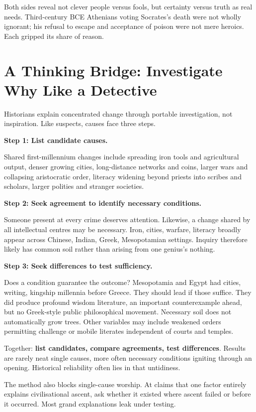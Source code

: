 Both sides reveal not clever people versus fools, but certainty versus truth as real needs. Third-century BCE Athenians voting Socrates's death were not wholly ignorant; his refusal to escape and acceptance of poison were not mere heroics. Each gripped its share of reason.

\section[Thinking Bridge: Investigate Causes]{A Thinking Bridge: Investigate Why Like a Detective}
Historians explain concentrated change through portable investigation, not inspiration. Like suspects, causes face three steps.

\textbf{Step 1: List candidate causes.}

Shared first-millennium changes include spreading iron tools and agricultural output, denser growing cities, long-distance networks and coins, larger wars and collapsing aristocratic order, literacy widening beyond priests into scribes and scholars, larger polities and stranger societies.

\textbf{Step 2: Seek agreement to identify necessary conditions.}

Someone present at every crime deserves attention. Likewise, a change shared by all intellectual centres may be necessary. Iron, cities, warfare, literacy broadly appear across Chinese, Indian, Greek, Mesopotamian settings. Inquiry therefore likely has common soil rather than arising from one genius's nothing.

\textbf{Step 3: Seek differences to test sufficiency.}

Does a condition guarantee the outcome? Mesopotamia and Egypt had cities, writing, kingship millennia before Greece. They should lead if those suffice. They did produce profound wisdom literature, an important counterexample ahead, but no Greek-style public philosophical movement. Necessary soil does not automatically grow trees. Other variables may include weakened orders permitting challenge or mobile literates independent of courts and temples.

Together: \textbf{list candidates, compare agreements, test differences}. Results are rarely neat single causes, more often necessary conditions igniting through an opening. Historical reliability often lies in that untidiness.

The method also blocks single-cause worship. At claims that one factor entirely explains civilisational ascent, ask whether it existed where ascent failed or before it occurred. Most grand explanations leak under testing.

